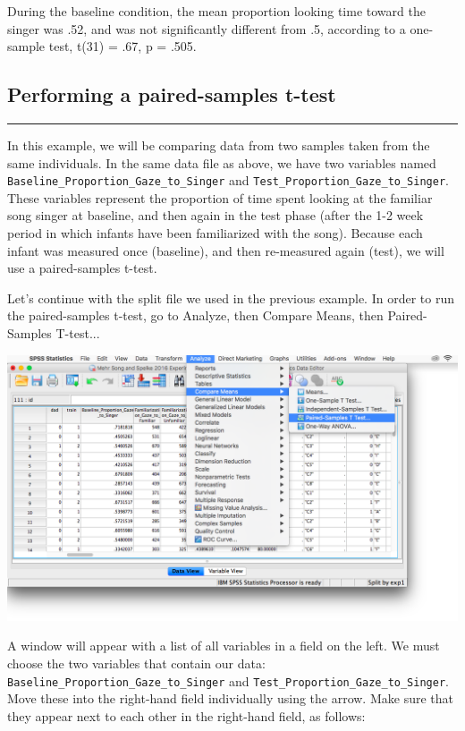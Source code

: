 \documentclass[
]{book}
\begin{document}
During the baseline condition, the mean proportion looking time toward the singer was .52, and was not significantly different from .5, according to a one-sample test, t(31) = .67, p = .505.

\hypertarget{performing-a-paired-samples-t-test}{%
\subsection{Performing a paired-samples t-test}\label{performing-a-paired-samples-t-test}}

\begin{center}\rule{0.5\linewidth}{0.5pt}\end{center}

In this example, we will be comparing data from two samples taken from the same individuals. In the same data file as above, we have two variables named \texttt{Baseline\_Proportion\_Gaze\_to\_Singer} and \texttt{Test\_Proportion\_Gaze\_to\_Singer}. These variables represent the proportion of time spent looking at the familiar song singer at baseline, and then again in the test phase (after the 1-2 week period in which infants have been familiarized with the song). Because each infant was measured once (baseline), and then re-measured again (test), we will use a paired-samples t-test.

Let's continue with the split file we used in the previous example. In order to run the paired-samples t-test, go to {Analyze}, then {Compare Means}, then {Paired-Samples T-test..}.

\includegraphics{img/6.4.17.png}

A window will appear with a list of all variables in a field on the left. We must choose the two variables that contain our data: \texttt{Baseline\_Proportion\_Gaze\_to\_Singer} and \texttt{Test\_Proportion\_Gaze\_to\_Singer}. Move these into the right-hand field individually using the arrow. Make sure that they appear next to each other in the right-hand field, as follows:
\end{document}
